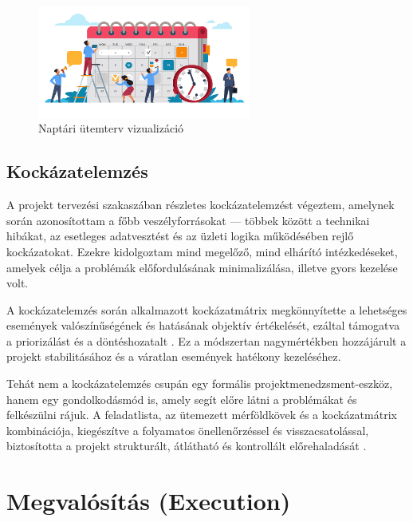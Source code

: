 \begin{figure}[H]
    \centering
    \includegraphics[width=70mm, keepaspectratio]{figures/plan.png}
    \caption{Naptári ütemterv vizualizáció}
    \label{fig:plan}
\end{figure}

\subsection{Kockázatelemzés}

A projekt tervezési szakaszában részletes kockázatelemzést végeztem, amelynek során azonosítottam a főbb veszélyforrásokat — többek között a technikai hibákat, 
az esetleges adatvesztést és az üzleti logika működésében rejlő kockázatokat.  
Ezekre kidolgoztam mind megelőző, mind elhárító intézkedéseket, amelyek célja a problémák előfordulásának minimalizálása, illetve gyors kezelése volt.  

A kockázatelemzés során alkalmazott kockázatmátrix megkönnyítette a lehetséges események valószínűségének és hatásának objektív értékelését, 
ezáltal támogatva a priorizálást és a döntéshozatalt \cite{Kovacs2016,Kaposi2019}.  
Ez a módszertan nagymértékben hozzájárult a projekt stabilitásához és a váratlan események hatékony kezeléséhez.  

Tehát nem a kockázatelemzés csupán egy formális projektmenedzsment-eszköz, hanem egy gondolkodásmód is, 
amely segít előre látni a problémákat és felkészülni rájuk.  
A feladatlista, az ütemezett mérföldkövek és a kockázatmátrix kombinációja, kiegészítve a folyamatos önellenőrzéssel és 
visszacsatolással, biztosította a projekt strukturált, átlátható és kontrollált előrehaladását \cite{Hajdu2014,Szalay2018}.

\section{Megvalósítás (Execution)}

